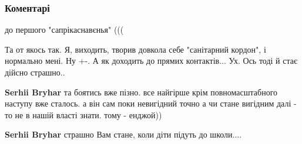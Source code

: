  
 
 
 
 
\subsubsection{Коментарі}

\begin{itemize}
 
до першого "сапрікаснавєнья" (((

\begin{itemize}
 

Та от якось так. Я, виходить, творив довкола себе "санітарний кордон", і
нормально мені. Ну +-. А як доходить до прямих контактів... Ух. Ось тоді й стає
дійсно страшно..


 
\textbf{Serhii Bryhar} та боятись вже пізно. все найгірше крім повномасштабного
наступу вже сталось. а він сам поки невигідний точно а чи стане вигідним далі -
то не в нашій власті знати. тому - енджой))

 
\textbf{Serhii Bryhar} страшно Вам стане, коли діти підуть до школи....


\end{itemize}
\end{itemize}
